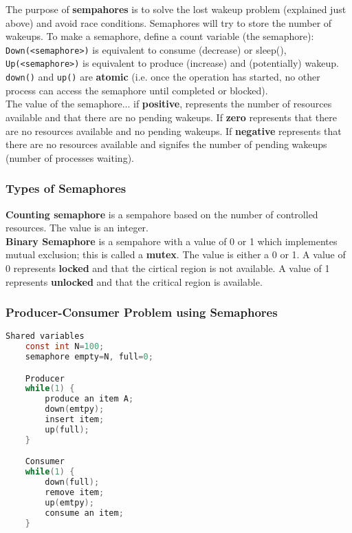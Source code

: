 \documentclass{article}
\newcommand{\bold}[1]{\textbf{#1}}
\begin{document}
    The purpose of \bold{sempahores} is to solve the lost wakeup problem (explained just above) and avoid race conditions. Semaphores will try to store the number of wakeups. To make a semaphore, define a count variable (the semaphore): \texttt{Down(<semaphore>)} is equivalent to consume (decrease) or sleep(), \texttt{Up(<semaphore>)} is equivalent to produce (increase) and (potentially) wakeup. \texttt{down()} and \texttt{up()} are \bold{atomic} (i.e. once the operation has started, no other process can access the semaphore until completed or blocked). \\ 

    \noindent The value of the semaphore... if \bold{positive}, represents the number of resources available and that there are no pending wakeups. If \bold{zero} represents that there are no resources available and no pending wakeups. If \bold{negative} represents that there are no resources available and signifes the number of pending wakeups (number of processes waiting). 

    \subsubsection{Types of Semaphores}

    \bold{Counting semaphore} is a sempahore based on the number of controlled resources. The value is an integer. \\ 

    \noindent \bold{Binary Semaphore} is a sempahore with a value of 0 or 1 which implementes mutual exclusion; this is called a \bold{mutex}. The value is either a 0 or 1. A value of 0 represents \bold{locked} and that the cirtical region is not available. A value of 1 represents \bold{unlocked} and that the critical region is available.

    \subsubsection{Producer-Consumer Problem using Semaphores}

    \begin{lstlisting}[language=C]
    Shared variables
    const int N=100;
    semaphore empty=N, full=0;

    Producer
    while(1) {
        produce an item A; 
        down(emtpy);
        insert item;
        up(full);
    }

    Consumer 
    while(1) {
        down(full);
        remove item;
        up(emtpy);
        consume an item;
    }
    \end{lstlisting}
\end{document}
